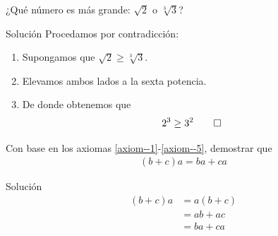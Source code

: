 {}
	\begin{problema}
		¿Qué número es más grande: $\sqrt{2}$ o $ \sqrt[3]{3} $?
	\end{problema}

{Solución}
	Procedamos por contradicción:
	\begin{enumerate}
		\item 
		Supongamos que $ \sqrt{2} \geq \sqrt[3]{3}$. 
		\item Elevamos ambos lados a la sexta potencia. 
		\item De donde obtenemos que 
		\begin{align*}
			2^{3} \geq 3^{2} \qed
		\end{align*} 
	\end{enumerate}

{}
	\begin{problema}
		Con base en los axiomas \eqref{axiom--1}-\eqref{axiom--5}, demostrar que
		\begin{align*}
			(b+c)a=ba+ca
		\end{align*}
	\end{problema}

{Solución}
		\begin{align*}
		(b+c)a &= a(b+c)\\ 
		&=ab+ac \\ 
		&=ba+ca
		\end{align*}

